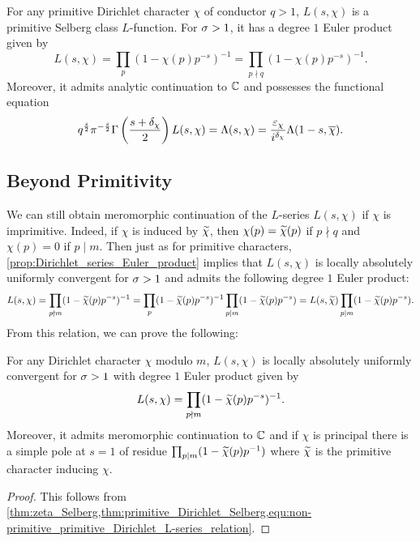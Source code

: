       \begin{theorem}\label{thm:primitive_Dirichlet_Selberg}
        For any primitive Dirichlet character $\chi$ of conductor $q > 1$, $L(s,\chi)$ is a primitive Selberg class $L$-function. For $\sigma > 1$, it has a degree $1$ Euler product given by
        \[
          L(s,\chi) = \prod_{p}(1-\chi(p)p^{-s})^{-1} = \prod_{p \nmid q}(1-\chi(p)p^{-s})^{-1}.
        \]
        Moreover, it admits analytic continuation to $\mathbb{C}$ and possesses the functional equation
        \[
          q^{\frac{s}{2}}\pi^{-\frac{s}{2}}\Gamma\left(\frac{s+\delta_{\chi}}{2}\right)L(s,\chi) = \Lambda(s,\chi) = \frac{\varepsilon_{\chi}}{i^{\delta_{\chi}}}\Lambda(1-s,\overline{\chi}).
        \]
      \end{theorem}
    \subsection*{Beyond Primitivity}
      We can still obtain meromorphic continuation of the $L$-series $L(s,\chi)$ if $\chi$ is imprimitive. Indeed, if $\chi$ is induced by $\widetilde{\chi}$, then $\chi(p) = \widetilde{\chi}(p)$ if $p \nmid q$ and $\chi(p) = 0$ if $p \mid m$. Then just as for primitive characters, \cref{prop:Dirichlet_series_Euler_product} implies that $L(s,\chi)$ is locally absolutely uniformly convergent for $\sigma > 1$ and admits the following degree $1$ Euler product:
      \begin{equation}\label{equ:non-primitive_primitive_Dirichlet_L-series_relation}
        L(s,\chi) = \prod_{p \nmid m}(1-\widetilde{\chi}(p)p^{-s})^{-1} = \prod_{p}(1-\widetilde{\chi}(p)p^{-s})^{-1}\prod_{p \mid m}(1-\widetilde{\chi}(p)p^{-s}) = L(s,\widetilde{\chi})\prod_{p \mid m}(1-\widetilde{\chi}(p)p^{-s}).
      \end{equation}
      From this relation, we can prove the following:

      \begin{theorem}\label{thm:analytic_continuation_Dirichlet}
        For any Dirichlet character $\chi$ modulo $m$, $L(s,\chi)$ is locally absolutely uniformly convergent for $\sigma > 1$ with degree $1$ Euler product given by
        \[
          L(s,\chi) = \prod_{p \nmid m}(1-\widetilde{\chi}(p)p^{-s})^{-1}.
        \]
        Moreover, it admits meromorphic continuation to $\mathbb{C}$ and if $\chi$ is principal there is a simple pole at $s = 1$ of residue $\prod_{p \mid m}(1-\widetilde{\chi}(p)p^{-1})$ where $\widetilde{\chi}$ is the primitive character inducing $\chi$.
      \end{theorem}
      \begin{proof}
        This follows from \cref{thm:zeta_Selberg,thm:primitive_Dirichlet_Selberg,equ:non-primitive_primitive_Dirichlet_L-series_relation}. 
      \end{proof}

